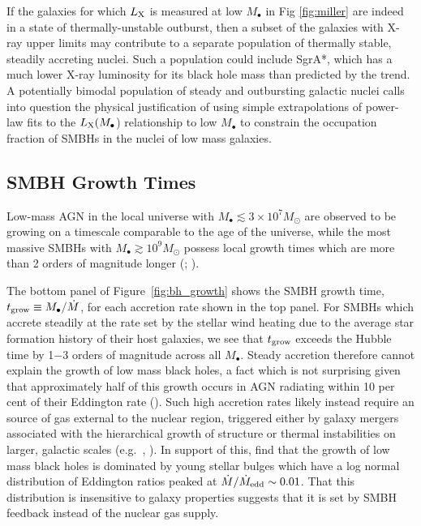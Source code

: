 \documentclass[usenatbib,fleqn]{mn2e}
\newcommand{\Mdot}{\dot{M}}
\begin{document}
If the galaxies for which $L_{\rm X}$ is measured at low $M_{\bullet}$
in Fig \ref{fig:miller} are indeed in a state of thermally-unstable
outburst, then a subset of the galaxies with X-ray upper limits
may contribute to a separate population of thermally stable, steadily
accreting nuclei.  Such a population could include SgrA*, which has a
much lower X-ray luminosity for its black hole mass than predicted by
the \citet{Miller+15} trend.  A potentially bimodal population of
steady and outbursting galactic nuclei calls into question the physical
justification of using simple extrapolations of power-law fits to the
$L_{\rm X}(M_{\bullet}$) relationship to low $M_{\bullet}$ to
constrain the occupation fraction of SMBHs in the nuclei of low mass
galaxies.



\subsection{SMBH Growth Times }
\label{sec:growth}

Low-mass AGN in the local universe with $M_{\bullet} \lesssim 3\times
10^{7}M_{\odot}$ are observed to be growing on a timescale comparable
to the age of the universe, while the most massive SMBHs with
$M_{\bullet} \gtrsim 10^{9}M_{\odot}$ possess local growth times which
are more than 2 orders of magnitude longer (\citealt{Heckman+04};
\citealt{Kauffmann&Heckman09}).

The bottom panel of Figure~\ref{fig:bh_growth} shows the SMBH growth
time, $t_{\rm grow} \equiv M_{\bullet}/\dot{M}$, for each accretion
rate shown in the top panel.  For SMBHs which accrete steadily at the
rate set by the stellar wind heating due to the average star formation
history of their host galaxies, we see that $t_{\rm grow}$ exceeds the
Hubble time by 1$-$3 orders of magnitude across all $M_{\bullet}$.
Steady accretion therefore cannot explain the growth of low mass black
holes, a fact which is not surprising given that approximately half of
this growth occurs in AGN radiating within 10 per cent of their
Eddington rate (\citealt{Heckman+04}).  Such high accretion rates
likely instead require an source of gas external to the nuclear
region, triggered either by galaxy mergers associated with the
hierarchical growth of structure or thermal instabilities on larger,
galactic scales (e.g.~\citealt{Ciotti+10}, \citealt{Voit+15}).  In
support of this, \citet{Kauffmann&Heckman09} find that the growth of
low mass black holes is dominated by young stellar bulges which have a
log normal distribution of Eddington ratios peaked at
$\Mdot/\dot{M}_{\rm edd} \sim 0.01$. That this distribution is
insensitive to galaxy properties suggests that it is set by SMBH
feedback instead of the nuclear gas supply.
\end{document}
